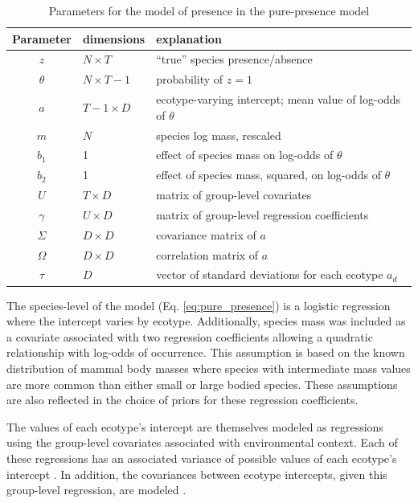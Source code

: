 \documentclass[12pt,letterpaper]{article}
\begin{document}
\begin{table}
  \centering
  \caption{Parameters for the model of presence in the pure-presence model}
  \begin{tabular}{c l l}
    Parameter & dimensions & explanation \\
    \hline
    \(z\) & \(N \times T\) & ``true'' species presence/absence \\
    \(\theta\) & \(N \times T - 1\) & probability of \(z = 1\) \\
    \(a\) & \(T - 1 \times D\) & ecotype-varying intercept; mean value of log-odds of \(\theta\) \\
    \(m\) & \(N\) & species log mass, rescaled \\
    \(b_{1}\) & 1 & effect of species mass on log-odds of \(\theta\) \\
    \(b_{2}\) & 1 & effect of species mass, squared, on log-odds of \(\theta\) \\
    \(U\) & \(T \times D\) & matrix of group-level covariates \\
    \(\gamma\) & \(U \times D\) & matrix of group-level regression coefficients \\
    \(\Sigma\) & \(D \times D\) & covariance matrix of \(a\) \\
    \(\Omega\) & \(D \times D\) & correlation matrix of \(a\) \\
    \(\tau\) & \(D\) & vector of standard deviations for each ecotype \(a_{d}\) \\
  \end{tabular}
  \label{tab:pres_param}
\end{table}

The species-level of the model (Eq. \ref{eq:pure_presence}) is a logistic regression where the intercept varies by ecotype. Additionally, species mass was included as a covariate associated with two regression coefficients allowing a quadratic relationship with log-odds of occurrence. This assumption is based on the known distribution of mammal body masses where species with intermediate mass values are more common than either small or large bodied species. These assumptions are also reflected in the choice of priors for these regression coefficients.

The values of each ecotype's intercept are themselves modeled as regressions using the group-level covariates associated with environmental context. Each of these regressions has an associated variance of possible values of each ecotype's intercept \citep{Gelman2007}. In addition, the covariances between ecotype intercepts, given this group-level regression, are modeled \citep{Gelman2007}.
\end{document}
